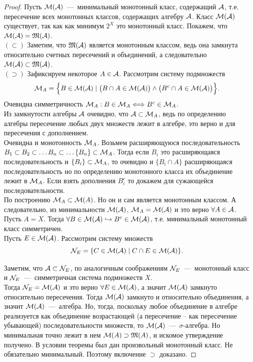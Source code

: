 \begin{proof}
    Пусть $\mathcal{M}(\mathcal{A})$~---~минимальный монотонный класс, содержащий $\mathcal{A}$, т.е. пересечение всех монотонных классов, содержащих алгебру $\mathcal{A}$. Класс $\mathcal{M}(\mathcal{A})$ существует, так как как минимум $2^X$ это монотонный класс. Покажем, что $\mathcal{M}(\mathcal{A}) = \mathfrak{M}(\mathcal{A})$. \\
    $(\subset)$ Заметим, что $\mathfrak{M}(\mathcal{A})$ является монотонным классом, ведь она замкнута относительно счетных пересечений и объединений, а следовательно $\mathcal{M}(\mathcal{A}) \subset \mathfrak{M}(\mathcal{A})$. \\
    $(\supset)$ Зафиксируем некоторое $A \in \mathcal{A}$. Рассмотрим систему подмножеств \[\mathcal{M}_A = \Big\{B \in \mathcal{M}(\mathcal{A}) \mid \big(B \cap A \in \mathcal{M}(\mathcal{A})\big) \wedge \big(B^c \cap A \in \mathcal{M}(\mathcal{A}) \big) \Big\}.\]
    Очевидна симметричность $\mathcal{M}_A: B \in \mathcal{M}_A \Longleftrightarrow B^c \in \mathcal{M}_A$.\\
    Из замкнутости алгебры $\mathcal{A}$ очевидно, что $\mathcal{A} \subset \mathcal{M}_A$, ведь по определению алгебры пересечение любых двух множеств лежит в алгебре, это верно и для пересечения с дополнением.\\
    Очевидна и монотонность $\mathcal{M}_A$. Возьмем расширяющуюся последовательность $B_1 \subset B_2 \subset \ldots B_n \subset \ldots \{ B_n \} \subset \mathcal{M}_A$. Тогда если $B_i$ это расширяющаяся последовательность и $\{B_i\} \subset \mathcal{M}_A$, то очевидно и $\{B_i \cap A\}$ расширяющаяся последовательность но по определению монотонного класса их объединение лежит в $\mathcal{M}_A$. Если взять дополнения $B_i^c$ то докажем для сужающейся последовательности.\\
    По построению $\mathcal{M}_A \subset\mathcal{M}(A)$. Но он и сам является монотонным классом. А следовательно, из минимальности $\mathcal{M}(\mathcal{A})$, $\mathcal{M}_A = \mathcal{M}(\mathcal{A})$ и это верно $\forall A \in \mathcal{A}$.\\
    Пусть $A = X$. Тогда $\forall B \in \mathcal{M}(\mathcal{A}) \hookrightarrow B^c \in \mathcal{M}(\mathcal{A})$, т.е. минимальный монотонный класс симметричен. \\

    Пусть $E \in \mathcal{M}(\mathcal{A})$. Рассмотрим систему множеств \[\mathcal{N}_E = \{C \in \mathcal{M}(\mathcal{A}) \mid C \cap E \in \mathcal{M}(\mathcal{A})\}.\]
    
    Заметим, что $\mathcal{A} \subset \mathcal{N}_E$, по аналогичным соображениям $\mathcal{N}_E$~---~монотонный класс и $\mathcal{N}_E$~---~симметричная система подмножеств $X$.\\
    Тогда $\mathcal{N}_E = \mathcal{M}(\mathcal{A})$ и это верно $\forall E \in \mathcal{M}(\mathcal{A})$, а значит $\mathcal{M}(\mathcal{A})$ замкнуто относительно пересечения. Тогда $\mathcal{M}(\mathcal{A})$ замкнуто и относительно объединения, а значит $\mathcal{M}(\mathcal{A})$~---~алгебра. Но, тогда, поскольку любое объединение в алгебре реализуется как объединение возрастающей (а пересечение -- как пересечение убывающей) последовательности множеств, то $\mathcal{M}(\mathcal{A})$~---~$\sigma$-алгебра. Но минимальная точно лежит в нем $\mathcal{M}(A) \supset \mathfrak{M}(A)$, и искомое утверждение получено. В условии теоремы был дан произвольный монотонный класс. Не обязательно минимальный. Поэтому включение $\supset$ доказано.
\end{proof}
